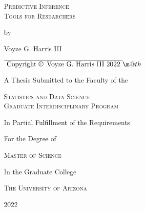 \documentclass[12pt,a4paper]{report}
\makeatletter
\newcommand*{\textoverline}[1]{$\overline{\hbox{#1}}\m@th$}
\makeatother
\begin{document}

\begin{titlepage}
	\centering
	{\scshape\LARGE Predictive Inference\\Tools for Researchers \par}
	\vspace{1cm}
	by\par
	\vspace{1cm}
	{\Large Voyze G. Harris III\par}
	\vspace{1cm}
	\textoverline{  Copyright \copyright \, Voyze G. Harris III 2022  }\\
	\vspace{1cm}
	{\Large A Thesis Submitted to the Faculty of the\par}
	\vspace{1cm}
	{\scshape\LARGE Statistics and Data Science\\Graduate Interdisciplinary Program\par}
  \vspace{1cm}
	{\Large In Partial Fulfillment of the Requirements\par}
	{\Large For the Degree of\par}
	\vspace{1cm}
	{\scshape\LARGE Master of Science\par}
	\vspace{1cm}
	{\Large In the Graduate College\par}
	\vspace{1cm}
	{\scshape\LARGE The University of Arizona\par}
	\vspace{1cm}
	{\Large 2022\par}



	\vfill

\end{titlepage}
\end{document}
